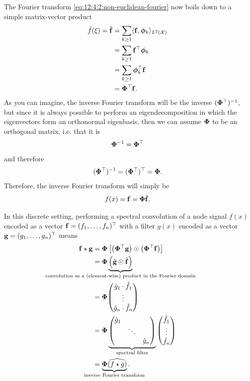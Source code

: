 The Fourier transform \cref{eq:12:4:2:non-euclidean-fourier} now boils down to a simple matrix-vector product
\begin{equation}
    \begin{aligned}
        \hat{f}(\xi) = \hat{\vb{f}} & = \sum_{k \geq 1} \langle \vb{f}, \vb*{\phi}_k \rangle_{L^2(\mathcal{X})} \\
        & = \sum_{k \geq 1} \vb{f}^{\top} \vb*{\phi}_k \\
        & = \sum_{k \geq 1} \vb*{\phi}_k^{\top} \vb{f}  \\
        & = \vb*{\Phi}^{\top} \vb{f}.
    \end{aligned}
\end{equation}
As you can imagine, the inverse Fourier transform will be the inverse $(\vb*{\Phi}^{\top})^{-1}$, but since it is always possible to perform an eigendecomposition in which the eigenvectors form an orthonormal eigenbasis, then we can assume $\vb*{\Phi}$ to be an orthogonal matrix, i.e. that it is 
\begin{equation}
    \vb*{\Phi}^{-1} = \vb*{\Phi}^{\top}   
\end{equation}
and therefore 
\begin{equation}
    (\vb*{\Phi}^{\top})^{-1} = (\vb*{\Phi}^{\top})^{\top} = \vb*{\Phi}.
\end{equation}
Therefore, the inverse Fourier transform will simply be 
\begin{equation}
    f(x) = \vb{f} = \vb*{\Phi} \hat{\vb{f}}.
\end{equation}

In this discrete setting, performing a spectral convolution of a node signal $f(x)$ encoded as a vector $\vb{f} = (f_1, \dots, f_n)^{\top}$ with a filter $g(x)$ encoded as a vector $\vb{g} = (g_1, \dots, g_n)^{\top}$ means
\begin{equation}
    \begin{aligned}
        \vb{f} \star \vb{g} & = \vb*{\Phi} \left[ \left(\vb*{\Phi}^{\top} \vb{g} \right) \odot \left(\vb*{\Phi}^{\top} \vb{f} \right) \right]\\
        & = \vb*{\Phi} \underbrace{\left( \hat{\vb{g}} \odot \hat{\vb{f}} \right)}_{\mathclap{\text{convolution as a (element-wise) product in the Fourier domain}}} \\ 
        & = \vb*{\Phi} \mqty( \hat{g}_1 \cdot \hat{f}_1 \\ \vdots \\ \hat{g}_n \cdot \hat{f}_n) \\
        & = \vb*{\Phi} \underbrace{\mqty(
            \hat{g}_1 & & \\
            & \ddots & \\
            & & \hat{g}_n
        )}_{\mathclap{\text{spectral filter}}} \mqty(\hat{f}_1 \\ \vdots \\ \hat{f}_n) \\ 
        & = \underbrace{\vb*{\Phi} \widehat{(f \star g)}}_{\mathclap{\text{inverse Fourier transform}}}.
        \label{eq:12:4:2:spectral-discrete-conv}
    \end{aligned}
\end{equation}

